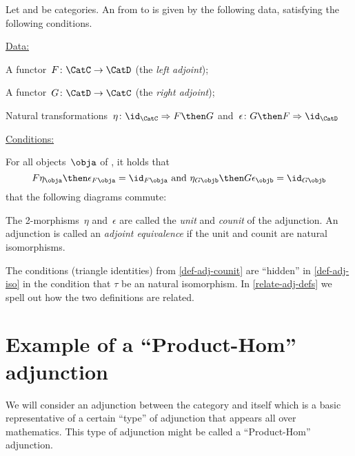 \begin{ctdefinition}
    \label{def-adj-counit}
    \label{def:cat-adjunction}
    Let \CatC and \CatD be categories. An \emph{} from \CatC to \CatD is given by the following data, satisfying the following conditions.

    \underline{Data:}
    \begin{compactenum}
        \item A functor~$F\colon \CatC \to \CatD$ (the \emph{left adjoint});
        \item A functor~$G\colon \CatD \to \CatC$ (the \emph{right adjoint});
        \item Natural transformations~$\eta \colon \id_\CatC \Rightarrow F \then G$ and~$\epsilon \colon G \then F \Rightarrow \id_\CatD$
    \end{compactenum}

    \underline{Conditions:}
    \begin{compactenum}
        \item For all objects~$\obja$ of \CatC, it holds that
        \begin{equation*}
            F\eta_\obja \then \epsilon_{F\obja} = \id_{F\obja} \text{ and }  \eta_{G\objb} \then G\epsilon_\objb = \id_{G\objb}
        \end{equation*}
         that the following diagrams commute:

        \begin{center}
        \end{center}
    \end{compactenum}

    The 2-morphisms~$\eta$ and~$\epsilon$ are called the \emph{unit} and \emph{counit} of the adjunction.
    An adjunction is called an \emph{adjoint equivalence} if the unit and counit are natural isomorphisms.
\end{ctdefinition}

\begin{remark}
    The conditions (triangle identities) from \cref{def-adj-counit} are ``hidden'' in \cref{def-adj-iso} in the condition that $\tau$ be an natural isomorphism. In \cref{relate-adj-defs} we spell out how the two definitions are related.
\end{remark}


\section{Example of a ``Product-Hom'' adjunction}
We will consider an adjunction between the category \Set and itself which is a basic representative of a certain ``type'' of adjunction that appears all over mathematics. This type of adjunction might be called a ``Product-Hom'' adjunction.


